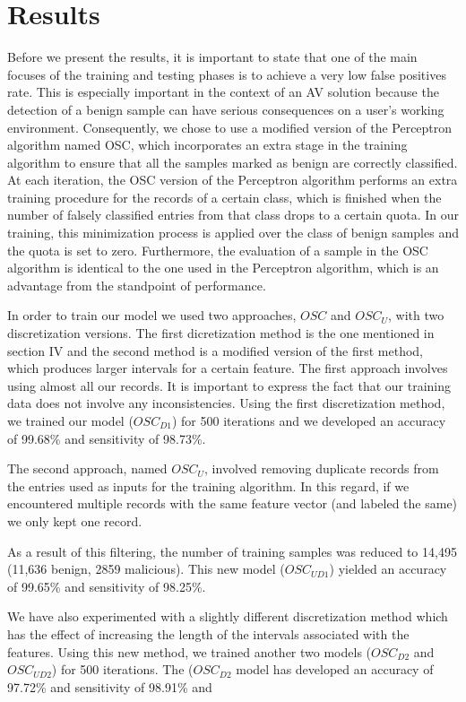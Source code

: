\section{Results}
\par
Before we present the results, it is important to state that one of the main focuses of the training and testing phases is to achieve a very low false positives rate. This is especially important in the context of an AV solution because the detection of a benign sample can have serious consequences on a user's working environment. Consequently, we chose to use a modified version of the Perceptron algorithm named OSC, which incorporates an extra stage in the training algorithm to ensure that all the samples marked as benign are correctly classified. At each iteration, the OSC version of the Perceptron algorithm performs an extra training procedure for the records of a certain class, which is finished when the number of falsely classified entries from that class drops to a certain quota. In our training, this minimization process is applied over the class of benign samples and the quota is set to zero. Furthermore, the evaluation of a sample in the OSC algorithm is identical to the one used in the Perceptron algorithm, which is an advantage from the standpoint of performance.
\par
In order to train our model we used two approaches, $OSC$ and $OSC_{U}$, with two discretization versions. The first dicretization method is the one mentioned in section IV and the second method is a modified version of the first method, which produces larger intervals for a certain feature. The first approach involves using almost all our records. It is important to express the fact that our training data does not involve any inconsistencies. Using the first discretization method, we trained our model ({$OSC_{D1}$}) for 500 iterations and we developed an accuracy of 99.68\% and sensitivity of 98.73\%. 
\par
The second approach, named $OSC_{U}$,  involved removing duplicate records from the entries used as inputs for the training algorithm. In this regard, if we encountered multiple records with the same feature vector (and labeled the same) we only kept one record.
\par
As a result of this filtering, the number of training samples was reduced to 14,495 (11,636 benign, 2859 malicious). This new model ({$OSC_{UD1}$}) yielded an accuracy of 99.65\% and sensitivity of 98.25\%.
\par
We have also experimented with a slightly different discretization method which has the effect of increasing the length of the intervals associated with the features. Using this new method, we trained another two models ({$OSC_{D2}$} and {$OSC_{UD2}$}) for 500 iterations. The ({$OSC_{D2}$} model has developed an accuracy of 97.72\% and sensitivity of 98.91\% and
